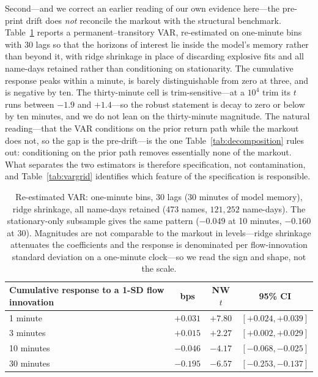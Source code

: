 \documentclass[11pt]{article}
\begin{document}
Second---and we correct an earlier reading of our own evidence here---the pre-print drift
does \emph{not} reconcile the markout with the structural benchmark. Table~\ref{tab:hasbrouck}
reports a \citet{hasbrouck1991} permanent--transitory VAR, re-estimated on one-minute bins
with 30 lags so that the horizons of interest lie inside the model's memory rather than
beyond it, with ridge shrinkage in place of discarding explosive fits and all name-days
retained rather than conditioning on stationarity. The cumulative response peaks within a
minute, is barely distinguishable from zero at three, and is negative by ten. The
thirty-minute cell is trim-sensitive---at a $10^4$ trim its $t$ runs between $-1.9$ and
$+1.4$---so the robust statement is decay to zero or below by ten minutes, and we do not
lean on the thirty-minute magnitude. The natural reading---that the VAR conditions on the prior return path while
the markout does not, so the gap is the pre-drift---is the one Table~\ref{tab:decomposition}
rules out: conditioning on the prior path removes essentially none of the markout. What
separates the two estimators is therefore specification, not contamination, and
Table~\ref{tab:vargrid} identifies which feature of the specification is responsible.

\begin{table}[htbp]
\centering
\begin{tabular}{lccc}
\toprule
\textbf{Cumulative response to a 1-SD flow innovation} & \textbf{bps} & \textbf{NW $t$} & \textbf{95\% CI} \\
\midrule
1 minute  & $+0.031$ & $+7.80$ & $[+0.024, +0.039]$ \\
3 minutes & $+0.015$ & $+2.27$ & $[+0.002, +0.029]$ \\
10 minutes & $-0.046$ & $-4.17$ & $[-0.068, -0.025]$ \\
30 minutes & $-0.195$ & $-6.57$ & $[-0.253, -0.137]$ \\
\bottomrule
\end{tabular}
\caption{Re-estimated \citet{hasbrouck1991} VAR: one-minute bins, 30 lags (30 minutes of
model memory), ridge shrinkage, all name-days retained (473 names, $121{,}252$ name-days).
The stationary-only subsample gives the same pattern ($-0.049$ at 10 minutes, $-0.160$ at
30). Magnitudes are not comparable to the markout in levels---ridge shrinkage attenuates the
coefficients and the response is denominated per flow-innovation standard deviation on a
one-minute clock---so we read the sign and shape, not the scale.}
\label{tab:hasbrouck}
\end{table}
\end{document}
